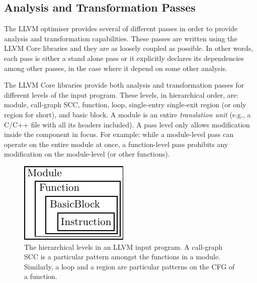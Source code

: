 \subsection{Analysis and Transformation Passes}

The LLVM optimiser provides several of different passes in order to provide analysis and transformation capabilities.
These passes are written using the LLVM Core libraries and they are as loosely coupled as possible.
In other words, each pass is either a stand alone pass or it explicitly declares its dependencies among other passes, in the case where it depend on some other analysis.

The LLVM Core libraries provide both analysis and transformation passes for different levels of the input program.
These levels, in hierarchical order, are: module, call-graph SCC, function, loop, single-entry single-exit region (or only region for short), and basic block.
A module is an entire \textit{translation unit} (e.g., a C/C++ file with all its headers included).
A pass level only allows modification inside the component in focus.
For example: while a module-level pass can operate on the entire module at once,
a function-level pass prohibits any modification on the module-level (or other functions).

\begin{figure}[h]
  \centering
  \includegraphics[scale=1]{figs/llvm-containers.pdf}
  \caption{The hierarchical levels in an LLVM input program. A call-graph SCC is a particular pattern amongst the functions in a module.
Similarly, a loop and a region are particular patterns on the CFG of a function.}
  \label{fig:llvm-containers}
\end{figure}


